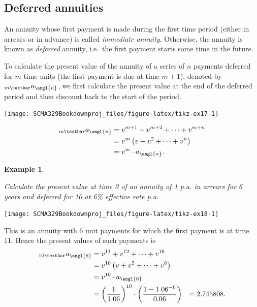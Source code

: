 \documentclass[
]{book}
\theoremstyle{definition}
\theoremstyle{definition}
\newtheorem{example}{Example}[chapter]
\theoremstyle{definition}
\theoremstyle{definition}
\theoremstyle{remark}
\begin{document}
\hypertarget{deferred-annuities}{%
\subsection{Deferred annuities}\label{deferred-annuities}}

An annuity whose first payment is made during the first time period
(either in arrears or in advance) is called \emph{immediate annuity}.
Otherwise, the annuity is known as \emph{deferred} annuity, i.e.~the first
payment starts some time in the future.

To calculate the present value of the annuity of a series of \(n\)
payments deferred for \(m\) time units (the first payment is due at time
\(m+1\)), denoted by \(_{m \textbar}a_\angl{n}\), we first calculate the
present value at the end of the deferred period and then discount back
to the start of the period.

\begin{center}\texttt{[image: SCMA329Bookdownproj\_files/figure-latex/tikz-ex17-1]} \end{center}

\[\begin{aligned}
    _{m \textbar} a_\angl{n}  &= v^{m+1} + v^{m+2} + \cdots +v^{m+n}  \\
    &= v^m  \left( v + v^2 + \cdots + v^n  \right) \\
    &= v^m \cdot  a_\angl{n}.\end{aligned}\]

\begin{example}
\protect\hypertarget{exm:unlabeled-div-33}{}\label{exm:unlabeled-div-33}

\emph{Calculate the present value at time 0 of an annuity of 1 p.a. in
arrears for 6 years and deferred for 10 at 6\% effective rate p.a.}

\end{example}

\begin{center}\texttt{[image: SCMA329Bookdownproj\_files/figure-latex/tikz-ex18-1]} \end{center}

This is an annuity with 6 unit payments for which the first payment is
at time 11. Hence the present values of such payments is
\[\begin{aligned}
    _{10 \textbar}a_\angl{6}
  &= v^{11} + v^{12} + \cdots +v^{16}  \\
    &= v^{10}  \left( v + v^2 + \cdots + v^6  \right) \\
    &= v^{10} \cdot  a_\angl{6} \\
    &= \left(\frac{1}{1.06}\right)^{10} \cdot \left( \frac{1- 1.06^{-6}}{0.06} \right)
    &= 2.745808.\end{aligned}\]
\end{document}
